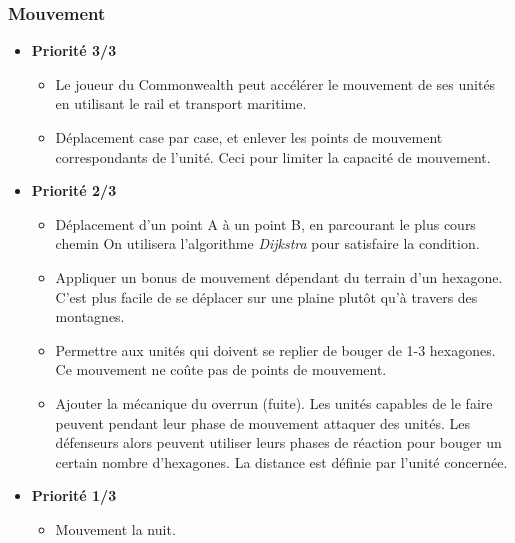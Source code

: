 \subsubsection{Mouvement}
\begin{itemize}
    \item \textbf{Priorité 3/3}
    \begin{itemize}
        \item Le joueur du Commonwealth peut accélérer le mouvement de ses unités en utilisant le rail et transport maritime.\xmark
        \item Déplacement case par case, et enlever les points de mouvement correspondants de l'unité. Ceci pour limiter la capacité de mouvement.\cmark
    \end{itemize}
    \item \textbf{Priorité 2/3}
    \begin{itemize}
        \item Déplacement d'un point A à un point B, en parcourant le plus cours chemin
            On utilisera l'algorithme \emph{Dijkstra} pour satisfaire la condition.\cmark
        \item Appliquer un bonus de mouvement dépendant du terrain d'un hexagone. C'est plus facile de se déplacer sur une plaine plutôt qu'à travers des montagnes.
        \item Permettre aux unités qui doivent se replier de bouger de 1-3 hexagones. Ce mouvement ne coûte pas de points de mouvement.\cmark
        \item Ajouter la mécanique du overrun (fuite). Les unités capables de le faire peuvent pendant leur phase de mouvement attaquer des unités. Les défenseurs alors peuvent utiliser leurs phases de réaction pour bouger un certain nombre d'hexagones. La distance est définie par l'unité concernée.\xmark
    \end{itemize}   
    \item \textbf{Priorité 1/3}
    \begin{itemize}
        \item Mouvement la nuit.
    \end{itemize}
\end{itemize}

